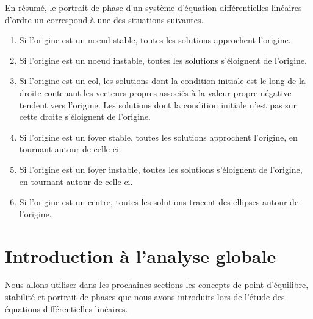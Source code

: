 {

En résumé, le portrait de phase d'un système d'équation
différentielles linéaires d'ordre un correspond à une des situations
suivantes.
\begin{enumerate}
\item Si l'origine est un noeud stable, toutes les solutions
  approchent l'origine.
\item Si l'origine est un noeud instable, toutes les solutions
  s'éloignent de l'origine.
\item Si l'origine est un col, les solutions dont la condition initiale
  est le long de la droite contenant les vecteurs propres associés à
  la valeur propre négative tendent vers l'origine.  Les solutions
  dont la condition initiale n'est pas sur cette droite s'éloignent de
  l'origine.
\item Si l'origine est un foyer stable, toutes les solutions
  approchent l'origine, en tournant autour de celle-ci. 
\item Si l'origine est un foyer instable, toutes les solutions
  s'éloignent de l'origine, en tournant autour de celle-ci.
\item Si l'origine est un centre, toutes les solutions tracent des
  ellipses autour de l'origine. 
\end{enumerate}

\section{Introduction à l'analyse globale}

Nous allons utiliser dans les prochaines sections les concepts de
point d'équilibre, stabilité et portrait de phases que nous avons
introduits lors de l'étude des équations différentielles linéaires.

}
